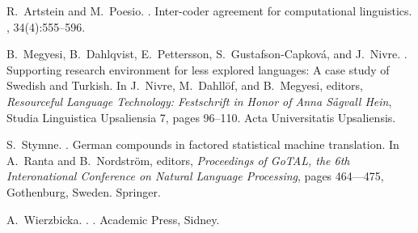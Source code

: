 \documentclass[10pt, a4paper]{article}
\begin{document}

% 

\begin{thebibliography}{}

R.~Artstein and M.~Poesio.
.
\newblock Inter-coder agreement for computational linguistics.
, 34(4):555--596.

B.~Megyesi, B.~Dahlqvist, E.~Pettersson, S.~Gustafson-Capkov\'a, and J.~Nivre.
.
\newblock Supporting research environment for less explored languages: A case
  study of {S}wedish and {T}urkish.
\newblock In J.~Nivre, M.~Dahll\"of, and B.~Megyesi, editors, {\em Resourceful
  Language Technology: Festschrift in Honor of Anna S\aa{}gvall Hein}, Studia
  Linguistica Upsaliensia 7, pages 96--110. Acta Universitatis Upsaliensis.

S.~Stymne.
.
\newblock German compounds in factored statistical machine translation.
\newblock In A.~Ranta and B.~Nordstr\"om, editors, {\em Proceedings of GoTAL,
  the 6th Interonational Conference on Natural Language Processing}, pages
  464–--475, Gothenburg, Sweden. Springer.

A.~Wierzbicka.
.
.
\newblock Academic Press, Sidney.

\end{thebibliography}
\end{document}
